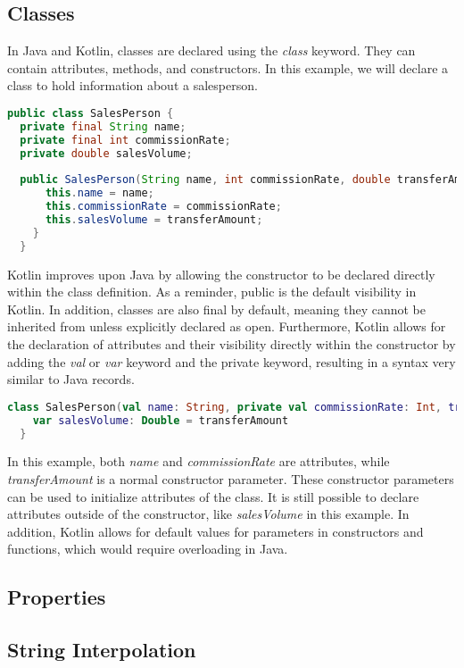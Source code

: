 \documentclass[a4paper, 11pt]{article}
\begin{document}
\subsection{Classes}
  In Java and Kotlin, classes are declared using the \textit{class} keyword. They can contain attributes, methods, and constructors.
  In this example, we will declare a class to hold information about a salesperson.
\begin{lstlisting}[language=Java,title={Java Class Declaration}]
public class SalesPerson {
  private final String name;
  private final int commissionRate;
  private double salesVolume;
  
  public SalesPerson(String name, int commissionRate, double transferAmount) {
      this.name = name;
      this.commissionRate = commissionRate;
      this.salesVolume = transferAmount;
    }
  }
\end{lstlisting}
  Kotlin improves upon Java by allowing the constructor to be declared directly within the class definition. As a reminder, public is the default visibility in Kotlin. In addition, classes are also final by default, meaning they cannot be inherited from unless explicitly declared as open.
  Furthermore, Kotlin allows for the declaration of attributes and their visibility directly within the constructor by adding the \textit{val} or \textit{var} keyword and the private keyword, resulting in a syntax very similar to Java records.
\begin{lstlisting}[language=Kotlin,title={Kotlin Class Declaration}]
  class SalesPerson(val name: String, private val commissionRate: Int, transferAmount: Double = 0.0) {
    var salesVolume: Double = transferAmount
  }
\end{lstlisting}
  In this example, both \textit{name} and \textit{commissionRate} are attributes, while \textit{transferAmount} is a normal constructor parameter. These constructor parameters can be used to initialize attributes of the class.
  It is still possible to declare attributes outside of the constructor, like \textit{salesVolume} in this example.
  In addition, Kotlin allows for default values for parameters in constructors and functions, which would require overloading in Java.
  
\subsection{Properties}
\subsection{String Interpolation}
\end{document}
